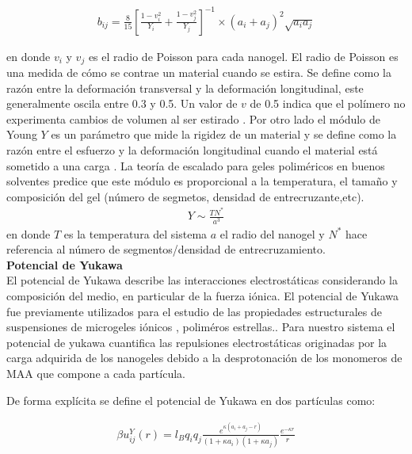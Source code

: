 	\begin{align}
		b_{ij} = \frac{8}{15}\left[\frac{1-v_i^2}{Y_i} + \frac{1-v_j^2}{Y_j}  \right]^{-1} \times(a_i +a_j)^2 \sqrt{a_ia_j}
		\label{eq:mc:bij_param}
	\end{align}
	
	\noindent en donde $v_i$ y $v_j$ es el radio de Poisson para cada nanogel.
	El radio de Poisson es una medida de c\'omo se contrae un material cuando se estira. Se define como la raz\'on entre la deformación transversal y la deformación longitudinal, este generalmente oscila entre 0.3 y 0.5. Un valor de $v$ de 0.5 indica que el pol\'imero no experimenta cambios de volumen al ser estirado \cite{bertoldi2010negative}.
	Por otro lado el m\'odulo de  Young $Y$  es un par\'ametro  que mide la rigidez de un material y se define como la raz\'on entre el esfuerzo y la deformaci\'on longitudinal cuando el material est\'a sometido a una carga \cite{ku2011review}.
	La teor\'ia de escalado para geles polim\'ericos en buenos solventes \cite{de1979scaling,hu2012polymer} predice que este m\'odulo es proporcional a la temperatura, el tamaño y composici\'on del gel (n\'umero de segmetos, densidad de entrecruzante,etc).
	\begin{align}
		Y \sim \frac{TN^*}{a^3}
	\end{align}
	\noindent en donde $T$ es la temperatura del sistema $a$ el radio del nanogel y $N^*$ hace referencia al n\'umero de segmentos/densidad de entrecruzamiento. \\
	
	
	\textbf{Potencial de Yukawa} \\
	
	El potencial de Yukawa describe las interacciones electrost\'aticas considerando la composici\'on del medio, en particular de la fuerza i\'onica.
	El potencial de Yukawa fue previamente utilizados para el estudio de las propiedades estructurales de suspensiones de microgeles i\'onicos \citet{weyer2018concentration}, polim\'eros estrellas.\cite{denton2003counterion}. Para nuestro sistema el potencial de yukawa cuantifica las repulsiones electrost\'aticas originadas por la carga adquirida de los nanogeles debido a la desprotonaci\'on  de los monomeros de MAA que compone a cada part\'icula.

	
	De forma expl\'icita se define el potencial de Yukawa en dos part\'iculas como: 
	
	\begin{align}
		\beta u^Y_{ij}(r) = l_Bq_i q_j \frac{e^{\kappa(a_i + a_j -r)}}{(1 +\kappa a_i)(1 + \kappa a_j)} \frac{e^{-\kappa r}}{r} 
		\label{eq:mc:yukawa}
	\end{align}
	
